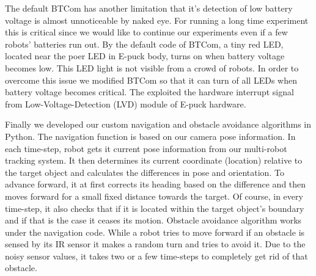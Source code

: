 The default BTCom has another limitation that it's detection of low battery voltage is almost unnoticeable by naked eye. For running a long time experiment this is critical since we would like to continue our experiments even if a few robots' batteries run out. By the default code of BTCom, a tiny red LED, located near the poer LED in E-puck body, turns on when battery voltage becomes low. This LED light is not visible from a crowd of robots. In order to overcome this issue we modified BTCom so that it can turn of all LEDs when battery voltage becomes critical. The exploited the hardware interrupt signal from Low-Voltage-Detection (LVD) module of E-puck hardware.

Finally we developed our custom navigation and obstacle avoidance algorithms in Python. The navigation function is based on our camera pose information. In each time-step,  robot gets it current pose information from our multi-robot tracking system. It then determines its current coordinate (location) relative to the target object and calculates the differences in pose and orientation. To advance forward, it at first corrects its heading based on the difference and then moves forward for a small fixed distance towards the target. Of course, in every time-step, it also checks that if it is located within the target object's boundary and if that is the case it ceases its motion. Obstacle avoidance algorithm works under the navigation code. While a robot tries to move forward if an obstacle is sensed by its IR sensor it makes a random turn and tries to avoid it. Due to the noisy sensor values, it takes two or a few time-steps to completely get rid of that obstacle. 
